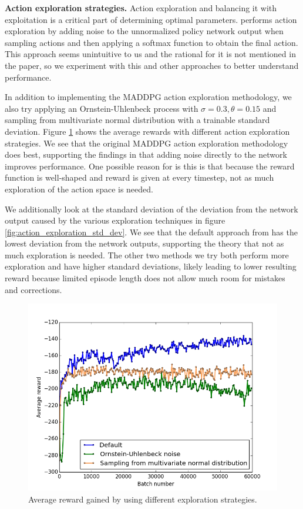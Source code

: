 \documentclass{article}
\begin{document}
\textbf{Action exploration strategies.} Action exploration and balancing it with exploitation is a critical part of determining optimal parameters. \cite{maddpg} performs action exploration by adding noise to the unnormalized policy network output when sampling actions and then applying a softmax function to obtain the final action. This approach seems unintuitive to us and the rational for it is not mentioned in the paper, so we experiment with this and other approaches to better understand performance.

In addition to implementing the MADDPG action exploration methodology, we also try applying an Ornstein-Uhlenbeck process with $\sigma = 0.3, \theta = 0.15$ and sampling from multivariate normal distribution with a trainable standard deviation. Figure \ref{fig:defaultVSouVSdist} shows the average rewards with different action exploration strategies. We see that the original MADDPG action exploration methodology does best, supporting the findings in \cite{plappert2017parameter} that adding noise directly to the network improves performance. One possible reason for is this is that because the reward function is well-shaped and reward is given at every timestep, not as much exploration of the action space is needed. 

We additionally look at the standard deviation of the deviation from the network output caused by the various exploration techniques in figure \ref{fig:action_exploration_std_dev}. We see that the default approach from \cite{maddpg} has the lowest deviation from the network outputs, supporting the theory that not as much exploration is needed. The other two methods we try both perform more exploration and have higher standard deviations, likely leading to lower resulting reward because  limited episode length does not allow much room for mistakes and corrections.

\begin{figure}
\begin{center}
\includegraphics[scale=0.4]{defaultVSouVSdist}
\end{center}
\caption{Average reward gained by using different exploration strategies.}
\label{fig:defaultVSouVSdist}
\end{figure}
\end{document}
